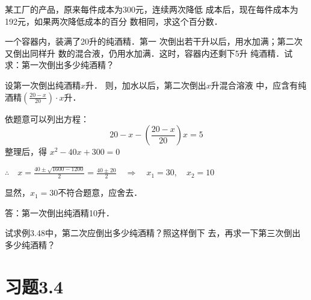 \begin{ex}
某工厂的产品，原来每件成本为300元，连续两次降低
成本后，现在每件成本为192元，如果两次降低成本的百分
数相同，求这个百分数．
\end{ex}




\begin{example}
一个容器内，装满了20升的纯酒精．第一
次倒出若干升以后，用水加满；第二次又倒出同样升
数的混合液，仍用水加满．这时，容器内还剩下5升
纯酒精．试求：第一次倒出多少纯酒精？
\end{example}

\begin{solution}
    设第一次倒出纯酒精$x$升．
则，加水以后，第二次倒出$x$升混合溶液
中，应含有纯酒精$\left(\frac{20-x}{20}\right)\cdot x$升．

依题意可以列出方程：
\[20-x-\left(\frac{20-x}{20}\right)x=5\]
整理后，得 $x^2-40x+300=0$

$\therefore\quad x=\frac{40\pm \sqrt{1600-1200}}{2}=\frac{40\pm 20}{2}\quad \Rightarrow\quad x_1=30,\quad x_2=10$

显然，$x_1=30$不符合题意，应舍去．

答：第一次倒出纯酒精10升．
\end{solution}

\begin{ex}
    试求例3.48中，第二次应倒出多少纯酒精？照这样倒下
去，再求一下第三次倒出多少纯酒精？
\end{ex}



\section*{习题3.4}

